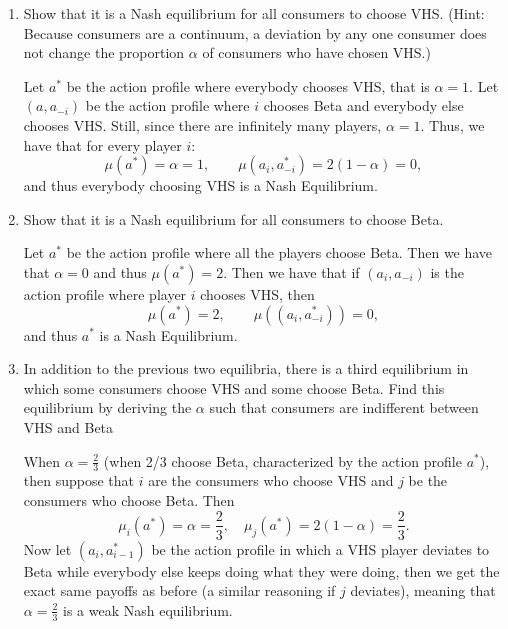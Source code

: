 \documentclass[11pt]{article}
\begin{document}
\begin{enumerate}
    \item 
    \begin{problem}
    Show that it is a Nash equilibrium for all consumers to choose VHS. (Hint:
Because consumers are a continuum, a deviation by any one consumer does not
change the proportion $\alpha$ of consumers who have chosen VHS.)
    \end{problem}
    \begin{solution}
    Let $a^\ast$ be the action profile where everybody chooses VHS, that is $\alpha = 1.$ Let $(a, a_{-i})$ be the action profile where $i$ chooses Beta and everybody else chooses VHS. Still, since there are infinitely many players, $\alpha =1.$ Thus, we have that for every player $i:$
    \[\mu(a^\ast) = \alpha = 1, \qquad \mu(a_i, a_{-i}^\ast) = 2(1-\alpha) = 0,\] and thus everybody choosing VHS is a Nash Equilibrium.
    \end{solution}
    \item 
    \begin{problem}
        Show that it is a Nash equilibrium for all consumers to choose Beta.
    \end{problem}
    \begin{solution}
        Let $a^\ast$ be the action profile where all the players choose Beta. Then we have that $\alpha = 0$ and thus $\mu(a^\ast) = 2.$ Then we have that if $(a_i, a_{-i})$ is the action profile where player $i$ chooses VHS, then 
        \[\mu(a^\ast) = 2, \qquad \mu((a_i, a_{-i}^\ast)) = 0,\] and thus $a^\ast$ is a Nash Equilibrium.
    \end{solution}
    \item 
    \begin{problem}
        In addition to the previous two equilibria, there is a third equilibrium in which
some consumers choose VHS and some choose Beta. Find this equilibrium by
deriving the $\alpha$ such that consumers are indifferent between VHS and Beta
    \end{problem}
    \begin{solution}
        When $\alpha = \frac{2}{3}$ (when 2/3 choose Beta, characterized by the action profile $a^\ast$), then suppose that $i$ are the consumers who choose VHS and $j$ be the consumers who choose Beta. Then 
        \[\mu_i(a^\ast)= \alpha = \frac{2}{3}, \quad \mu_j(a^\ast) = 2(1 - \alpha) = \frac{2}{3}.\] Now let $(a_i, a_{i-1}^\ast)$ be the action profile in which a VHS player deviates to Beta while everybody else keeps doing what they were doing, then we get the exact same payoffs as before (a similar reasoning if $j$ deviates), meaning that $\alpha = \frac{2}{3}$ is a weak Nash equilibrium. 
    \end{solution}
\end{enumerate}
\end{document}
